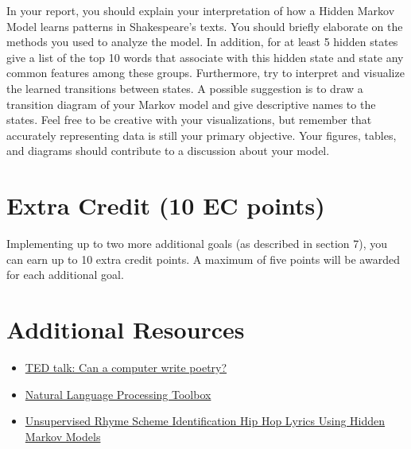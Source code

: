 \begin{report}
    In your report, you should explain your interpretation of how a Hidden Markov Model learns patterns in Shakespeare's texts. You should briefly elaborate on the methods you used to analyze the model. In addition, for at least 5 hidden states give a list of the top 10 words that associate with this hidden state and state any common features among these groups. Furthermore, try to interpret and visualize the learned transitions between states. A possible suggestion is to draw a transition diagram of your Markov model and give descriptive names to the states. Feel free to be creative with your visualizations, but remember that accurately representing data is still your primary objective. Your figures, tables, and diagrams should contribute to a discussion about your model.
\end{report}

\section{Extra Credit (10 EC points)}
Implementing up to two more additional goals (as described in section 7), you can earn up to 10 extra credit points. A maximum of five points will be awarded for each additional goal.

\section{Additional Resources}
\begin{itemize}
    \item \href{https://www.ted.com/talks/oscar_schwartz_can_a_computer_write_poetry?language=en}{TED talk: Can a computer write poetry?}
    \item \href{http://www.nltk.org/}{Natural Language Processing Toolbox}
    \item \href{http://link.springer.com/chapter/10.1007%2F978-3-642-39593-2_3}{Unsupervised Rhyme Scheme Identification Hip Hop Lyrics Using Hidden Markov Models}
\end{itemize}

